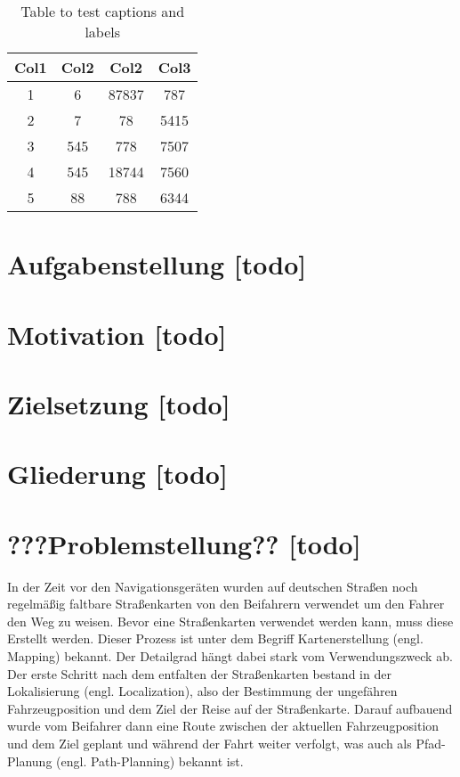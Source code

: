 \begin{table}[!ht]
\centering
\begin{tabular}{||c c c c||} 
 \hline
 Col1 & Col2 & Col2 & Col3 \\ [0.5ex] 
 \hline\hline
 1 & 6 & 87837 & 787 \\ 
 2 & 7 & 78 & 5415 \\
 3 & 545 & 778 & 7507 \\
 4 & 545 & 18744 & 7560 \\
 5 & 88 & 788 & 6344 \\ [1ex] 
 \hline
\end{tabular}
\caption{Table to test captions and labels}
\label{table:1}
\end{table}

\section{Aufgabenstellung [todo]}

\section{Motivation [todo]}

\section{Zielsetzung [todo]}

\section{Gliederung [todo]}

\section{???Problemstellung?? [todo]}

In der Zeit vor den Navigationsgeräten wurden auf deutschen Straßen noch regelmäßig faltbare Straßenkarten von den Beifahrern verwendet um den Fahrer den Weg zu weisen. Bevor eine Straßenkarten verwendet werden kann, muss diese Erstellt werden. Dieser Prozess ist unter dem Begriff Kartenerstellung (engl. Mapping) bekannt. Der Detailgrad hängt dabei stark vom Verwendungszweck ab. Der erste Schritt nach dem entfalten der Straßenkarten bestand in der Lokalisierung (engl. Localization), also der Bestimmung der ungefähren Fahrzeugposition und dem Ziel der Reise auf der Straßenkarte. Darauf aufbauend wurde vom Beifahrer dann eine Route zwischen der aktuellen Fahrzeugposition und dem Ziel geplant und während der Fahrt weiter verfolgt, was auch als Pfad-Planung (engl. Path-Planning) bekannt ist.

